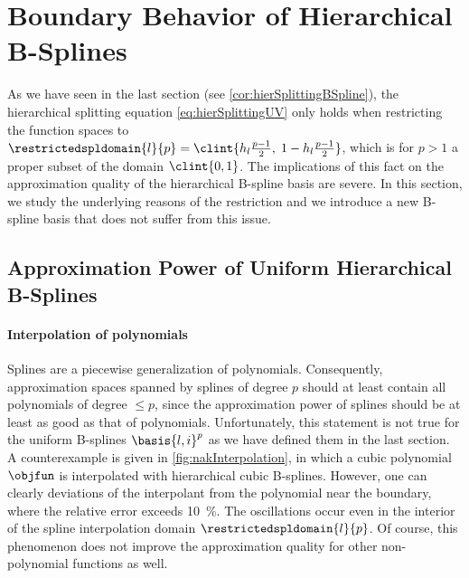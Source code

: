 \section{Boundary Behavior of Hierarchical B-Splines}
\label{sec:32notAKnot}

As we have seen in the last section (see \cref{cor:hierSplittingBSpline}),
the hierarchical splitting equation \eqref{eq:hierSplittingUV}
only holds when restricting the function spaces to
$\restrictedspldomain{l}{p} = \clint{\ms{l} \tfrac{p-1}{2},\; 1 - \ms{l} \tfrac{p-1}{2}}$,
which is for $p > 1$ a proper subset of the domain $\clint{0, 1}$.
The implications of this fact on the approximation quality
of the hierarchical B-spline basis are severe.
In this section, we study the underlying reasons of the restriction and
we introduce a new B-spline basis that does not suffer from this issue.



\subsection{Approximation Power of Uniform Hierarchical B-Splines}
\label{sec:321approximation}


\paragraph{Interpolation of polynomials}

Splines are a piecewise generalization of polynomials.
Consequently, approximation spaces spanned by splines of degree $p$ should
at least contain all polynomials of degree $\le p$,
since the approximation power of splines should be at least as good
as that of polynomials.
Unfortunately, this statement is not true for the uniform B-splines
$\basis{l,i}^p$ as we have defined them in the last section.
A counterexample is given in \cref{fig:nakInterpolation},
in which a cubic polynomial $\objfun$ is interpolated with
hierarchical cubic B-splines.
However, one can clearly deviations of the interpolant from the polynomial
near the boundary, where the relative error exceeds \SI{10}{\percent}.
The oscillations occur even in the interior of the
spline interpolation domain $\restrictedspldomain{l}{p}$.
Of course, this phenomenon does not improve the approximation quality
for other non-polynomial functions as well.

